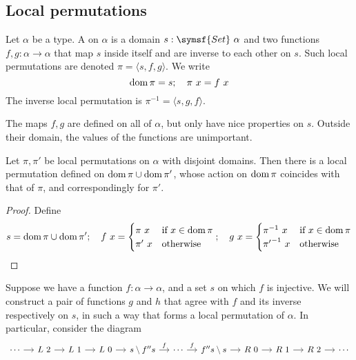 \subsection{Local permutations}
\begin{definition}
    Let \( \alpha \) be a type.
    A  on \( \alpha \) is a domain \( s : \symsf{Set}\ \alpha \) and two functions \( f, g : \alpha \to \alpha \) that map \( s \) inside itself and are inverse to each other on \( s \).
    Such local permutations are denoted \( \pi = \langle s, f, g \rangle \).
    We write
    \[ \dom \pi = s;\quad \pi\ x = f\ x \]
    The inverse local permutation is \( \pi^{-1} = \langle s, g, f \rangle \).
\end{definition}
\begin{remark}
    The maps \( f, g \) are defined on all of \( \alpha \), but only have nice properties on \( s \).
    Outside their domain, the values of the functions are unimportant.
\end{remark}
\begin{lemma}
    \label{lem:localPerm_piecewise}
    Let \( \pi, \pi' \) be local permutations on \( \alpha \) with disjoint domains.
    Then there is a local permutation defined on \( \operatorname{dom} \pi \cup \operatorname{dom} \pi' \), whose action on \( \operatorname{dom} \pi \) coincides with that of \( \pi \), and correspondingly for \( \pi' \).
\end{lemma}
\begin{proof}
    Define
    \[ s = \operatorname{dom} \pi \cup \operatorname{dom} \pi';\quad
    f\ x = \begin{cases}
        \pi\ x & \text{if } x \in \operatorname{dom} \pi \\
        \pi'\ x & \text{otherwise}
    \end{cases};\quad
    g\ x = \begin{cases}
        \pi^{-1}\ x & \text{if } x \in \operatorname{dom} \pi \\
        {\pi'}^{-1}\ x & \text{otherwise}
    \end{cases} \]
\end{proof}
Suppose we have a function \( f : \alpha \to \alpha \), and a set \( s \) on which \( f \) is injective.
We will construct a pair of functions \( g \) and \( h \) that agree with \( f \) and its inverse respectively on \( s \), in such a way that forms a local permutation of \( \alpha \).
In particular, consider the diagram
\[\begin{tikzcd}[column sep=small]
	\cdots & {L\ 2} & {L\ 1} & {L\ 0} & {s \setminus f''s} & \cdots & {f''s \setminus s} & {R\ 0} & {R\ 1} & {R\ 2} & \cdots
	\arrow[from=1-1, to=1-2]
	\arrow[from=1-2, to=1-3]
	\arrow[from=1-3, to=1-4]
	\arrow[from=1-4, to=1-5]
	\arrow["f", from=1-5, to=1-6]
	\arrow["f", from=1-6, to=1-7]
	\arrow[from=1-7, to=1-8]
	\arrow[from=1-8, to=1-9]
	\arrow[from=1-9, to=1-10]
	\arrow[from=1-10, to=1-11]
\end{tikzcd}\]
